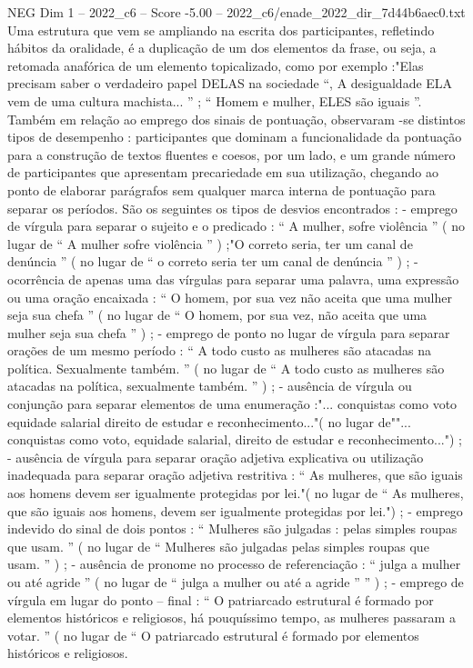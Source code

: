 \begin{textsample}{NEG Dim 1 – 2022\_c6 – Score -5.00 – 2022\_c6/enade\_2022\_dir\_7d44b6aec0.txt}
Uma estrutura que vem se ampliando na escrita dos participantes, refletindo hábitos da oralidade, é a duplicação de um dos elementos da frase, ou seja, a retomada anafórica de um elemento topicalizado, como por exemplo :"Elas precisam saber o verdadeiro papel DELAS na sociedade “, A desigualdade ELA vem de uma cultura machista... ” ; “ Homem e mulher, ELES são iguais ”.
Também em relação ao emprego dos sinais de pontuação, observaram -se distintos tipos de desempenho : participantes que dominam a funcionalidade da pontuação para a construção de textos fluentes e coesos, por um lado, e um grande número de participantes que apresentam precariedade em sua utilização, chegando ao ponto de elaborar parágrafos sem qualquer marca interna de pontuação para separar os períodos.
São os seguintes os tipos de desvios encontrados : - emprego de vírgula para separar o sujeito e o predicado : “ A mulher, sofre violência ” ( no lugar de “ A mulher sofre violência ” ) ;"O correto seria, ter um canal de denúncia ” ( no lugar de “ o correto seria ter um canal de denúncia ” ) ; - ocorrência de apenas uma das vírgulas para separar uma palavra, uma expressão ou uma oração encaixada : “ O homem, por sua vez não aceita que uma mulher seja sua chefa ” ( no lugar de “ O homem, por sua vez, não aceita que uma mulher seja sua chefa ” ) ; - emprego de ponto no lugar de vírgula para separar orações de um mesmo período : “ A todo custo as mulheres são atacadas na política.
Sexualmente também. ” ( no lugar de “ A todo custo as mulheres são atacadas na política, sexualmente também. ” ) ; - ausência de vírgula ou conjunção para separar elementos de uma enumeração :"... conquistas como voto equidade salarial direito de estudar e reconhecimento..."( no lugar de""... conquistas como voto, equidade salarial, direito de estudar e reconhecimento...") ; - ausência de vírgula para separar oração adjetiva explicativa ou utilização inadequada para separar oração adjetiva restritiva : “ As mulheres, que são iguais aos homens devem ser igualmente protegidas por lei."( no lugar de “ As mulheres, que são iguais aos homens, devem ser igualmente protegidas por lei.") ; - emprego indevido do sinal de dois pontos : “ Mulheres são julgadas : pelas simples roupas que usam. ” ( no lugar de “ Mulheres são julgadas pelas simples roupas que usam. ” ) ; - ausência de pronome no processo de referenciação : “ julga a mulher ou até agride ” ( no lugar de “ julga a mulher ou até a agride ” ” ) ; - emprego de vírgula em lugar do ponto – final : “ O patriarcado estrutural é formado por elementos históricos e religiosos, há pouquíssimo tempo, as mulheres passaram a votar. ” ( no lugar de “ O patriarcado estrutural é formado por elementos históricos e religiosos.

\end{textsample}
